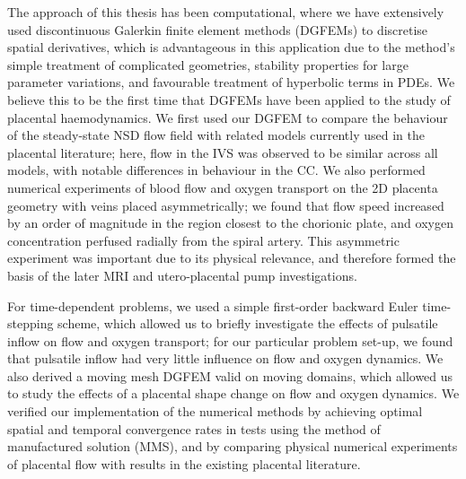        The approach of this thesis has been computational, where we have extensively used discontinuous Galerkin finite element methods (DGFEMs) to discretise spatial derivatives, which is advantageous in this application due to the method's simple treatment of complicated geometries, stability properties for large parameter variations, and favourable treatment of hyperbolic terms in PDEs. We believe this to be the first time that DGFEMs have been applied to the study of placental haemodynamics. We first used our DGFEM to compare the behaviour of the steady-state NSD flow field with related models currently used in the placental literature; here, flow in the IVS was observed to be similar across all models, with notable differences in behaviour in the CC. We also performed numerical experiments of blood flow and oxygen transport on the 2D placenta geometry with veins placed asymmetrically; we found that flow speed increased by an order of magnitude in the region closest to the chorionic plate, and oxygen concentration perfused radially from the spiral artery. This asymmetric experiment was important due to its physical relevance, and therefore formed the basis of the later MRI and utero-placental pump investigations.

        For time-dependent problems, we used a simple first-order backward Euler time-stepping scheme, which allowed us to briefly investigate the effects of pulsatile inflow on flow and oxygen transport; for our particular problem set-up, we found that pulsatile inflow had very little influence on flow and oxygen dynamics. We also derived a moving mesh DGFEM valid on moving domains, which allowed us to study the effects of a placental shape change on flow and oxygen dynamics. We verified our implementation of the numerical methods by achieving optimal spatial and temporal convergence rates in tests using the method of manufactured solution (MMS), and by comparing physical numerical experiments of placental flow with results in the existing placental literature.

